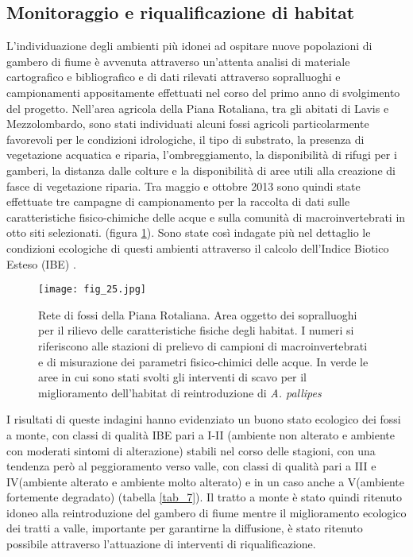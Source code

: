\documentclass[11pt,a4paper,italian,twoside,openany]{memoir}
\begin{document}
\subsection{Monitoraggio e riqualificazione di habitat}
L'individuazione degli ambienti più idonei ad ospitare nuove popolazioni di gambero di fiume è avvenuta attraverso un'attenta analisi di materiale cartografico e bibliografico e di dati rilevati attraverso sopralluoghi e campionamenti appositamente effettuati nel corso del primo anno di svolgimento del progetto. Nell'area agricola della Piana Rotaliana, tra gli abitati di Lavis e Mezzolombardo, sono stati individuati alcuni fossi agricoli particolarmente favorevoli per le condizioni idrologiche, il tipo di substrato, la presenza di vegetazione acquatica e riparia, l'ombreggiamento, la disponibilità di rifugi per i gamberi, la distanza dalle colture e la disponibilità di aree utili alla creazione di fasce di vegetazione riparia. Tra maggio e ottobre 2013 sono quindi state effettuate tre campagne di campionamento per la raccolta di dati sulle caratteristiche fisico-chimiche delle acque e sulla comunità di macroinvertebrati in otto siti selezionati. (figura \ref{fig_25}). Sono state così indagate più nel dettaglio le condizioni ecologiche di questi ambienti attraverso il calcolo dell'Indice Biotico Esteso (IBE) \cite{Ghetti 1997}. 

\begin{figure}
  \centering
  \texttt{[image: fig\_25.jpg]}
  \caption{Rete di fossi della Piana Rotaliana. Area oggetto dei sopralluoghi per il rilievo delle caratteristiche fisiche degli habitat. I numeri si riferiscono alle stazioni di prelievo di campioni di macroinvertebrati e di misurazione dei parametri fisico-chimici delle acque. In verde le aree in cui sono stati svolti gli interventi di scavo per il miglioramento dell'habitat di reintroduzione di \emph{A. pallipes}}
  \label{fig_25}
\end{figure}

I risultati di queste indagini hanno evidenziato un buono stato ecologico dei fossi a monte, con classi di qualità IBE pari a I-II (ambiente non alterato e ambiente con moderati sintomi di alterazione) stabili nel corso delle stagioni, con una tendenza però al peggioramento verso valle, con classi di qualità pari a III e IV(ambiente alterato e ambiente molto alterato) e in un caso anche a V(ambiente fortemente degradato) (tabella \ref{tab_7}). 
Il tratto a monte è stato quindi ritenuto idoneo alla reintroduzione del gambero di fiume mentre il miglioramento ecologico dei tratti a valle, importante per garantirne la diffusione, è stato ritenuto possibile attraverso l'attuazione di interventi di riqualificazione. 
\end{document}
